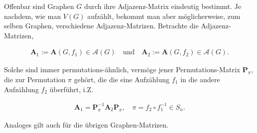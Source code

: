         \begin{remark} \label{rem:graph_matrix_similarity}

            Offenbar sind Graphen $G$ durch ihre Adjazenz-Matrix eindeutig bestimmt.
            Je nachdem, wie man $V(G)$ aufzählt, bekommt man aber möglicherweise, zum selben Graphen, verschiedene Adjazenz-Matrizen.
            Betrachte die Adjazenz-Matrizen,

            \begin{align*}
                \mathbf A_1 := \mathbf A(G, f_1) \in \mathcal A(G)
                \quad
                \text{und}
                \quad
                \mathbf A_2 :=  \mathbf A(G, f_2) \in \mathcal A(G).
            \end{align*}

            Solche sind immer permutations-ähnlich, vermöge jener Permutations-Matrix $\mathbf P_\pi$, die zur Permutation $\pi$ gehört, die die eine Aufzählung $f_1$ in die andere Aufzählung $f_2$ überführt, i.Z.

            \begin{align*}
                \mathbf A_1 = \mathbf P_\pi^{-1} \mathbf A_2 \mathbf P_\pi,
                \quad
                \pi = f_2 \circ f_1^{-1} \in S_n.
            \end{align*}

            Analoges gilt auch für die übrigen Graphen-Matrizen.

        \end{remark}


